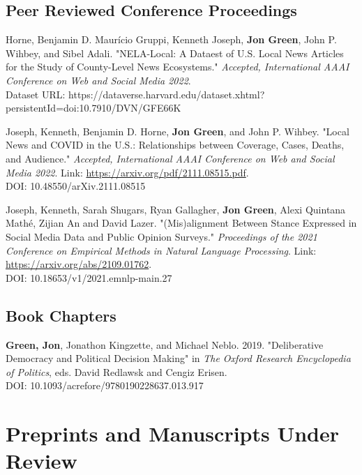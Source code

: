 \documentclass[letterpaper]{article}
\begin{document}
\subsection*{Peer Reviewed Conference Proceedings}

\begin{etaremune}
\item Horne, Benjamin D. Maur\'{i}cio Gruppi, Kenneth Joseph, \textbf{Jon Green}, John P. Wihbey, and Sibel Adali. "NELA-Local: A Dataest of U.S. Local News Articles for the Study of County-Level News Ecosystems." \textit{Accepted, International AAAI Conference on Web and Social Media 2022}.\\
Dataset URL: https://dataverse.harvard.edu/dataset.xhtml?persistentId=doi:10.7910/DVN/GFE66K

\item Joseph, Kenneth, Benjamin D. Horne, \textbf{Jon Green}, and John P. Wihbey. "Local News and COVID in the U.S.: Relationships between Coverage, Cases, Deaths, and Audience." \textit{Accepted, International AAAI Conference on Web and Social Media 2022}. Link: \url{https://arxiv.org/pdf/2111.08515.pdf}.\\
DOI: 10.48550/arXiv.2111.08515

\item Joseph, Kenneth, Sarah Shugars, Ryan Gallagher, \textbf{Jon Green}, Alexi Quintana Mathé, Zijian An and David Lazer. "(Mis)alignment Between Stance Expressed in Social Media Data and Public Opinion Surveys." \textit{Proceedings of the 2021 Conference on Empirical Methods in Natural Language Processing}. Link: \url{https://arxiv.org/abs/2109.01762}.\\
DOI: 10.18653/v1/2021.emnlp-main.27
\end{etaremune}

\subsection*{Book Chapters}

\begin{etaremune}
\item \textbf{Green, Jon}, Jonathon Kingzette, and Michael Neblo. 2019. "Deliberative Democracy and Political Decision Making" in \textit{The Oxford Research Encyclopedia of Politics}, eds. David Redlawsk and Cengiz Erisen.\\
DOI: 10.1093/acrefore/9780190228637.013.917
\end{etaremune}

\section*{Preprints and Manuscripts Under Review}
\end{document}
